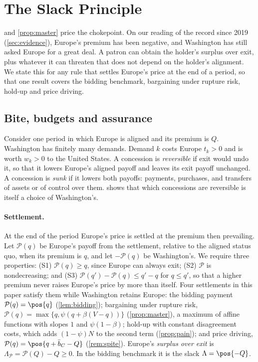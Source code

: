 \section{The Slack Principle}\label{sec:slack}

 and \cref{prop:master} price the chokepoint. On our reading of the record since 2019 (\cref{sec:evidence}), Europe's premium has been negative, and Washington has still asked Europe for a great deal. A patron can obtain the holder's surplus over exit, plus whatever it can threaten that does not depend on the holder's alignment. We state this for any rule that settles Europe's price at the end of a period, so that one result covers the bidding benchmark, bargaining under rupture risk, hold-up and price driving.

\subsection{Bite, budgets and assurance}\label{sec:slackprinciple}

Consider one period in which Europe is aligned and its premium is $Q$. Washington has finitely many demands. Demand $k$ costs Europe $t_k>0$ and is worth $w_k>0$ to the United States. A concession is \emph{reversible} if exit would undo it, so that it lowers Europe's aligned payoff and leaves its exit payoff unchanged. A concession is \emph{sunk} if it lowers both payoffs: payments, purchases, and transfers of assets or of control over them.  shows that which concessions are reversible is itself a choice of Washington's.

\paragraph{Settlement.} At the end of the period Europe's price is settled at the premium then prevailing. Let $\mathcal P(q)$ be Europe's payoff from the settlement, relative to the aligned status quo, when its premium is $q$, and let $-\mathcal P(q)$ be Washington's. We require three properties: (S1) $\mathcal P(q)\ge q$, since Europe can always exit; (S2) $\mathcal P$ is nondecreasing; and (S3) $\mathcal P(q')-\mathcal P(q)\le q'-q$ for $q\le q'$, so that a higher premium never raises Europe's price by more than itself. Four settlements in this paper satisfy them while Washington retains Europe: the bidding payment $\mathcal P(q)=\pos{q}$ (\cref{lem:bidding}); bargaining under rupture risk, $\mathcal P(q)=\max\{q,\psi(q+\beta(V-q))\}$ (\cref{prop:master}), a maximum of affine functions with slopes $1$ and $\psi(1-\beta)$; hold-up with constant disagreement costs, which adds $(1-\psi)N$ to the second term (\cref{prop:pain}); and price driving, $\mathcal P(q)=\pos{q+\bar b_C-Q}$ (\cref{rem:spite}). Europe's \emph{surplus over exit} is $\Lambda_{\mathcal P}=\mathcal P(Q)-Q\ge 0$. In the bidding benchmark it is the slack $\Lambda=\pos{-Q}$.

